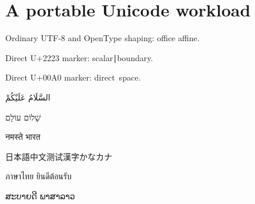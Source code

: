 \documentclass{article}
\providecommand{\aitexlanguage}[1]{}
\begin{document}
\section*{A portable Unicode workload}
Ordinary UTF-8 and OpenType shaping: office affine.

Direct U+2223 marker: scalar∣boundary.

Direct U+00A0 marker: direct space.




{\arabicfont\aitexlanguage{ar}السَّلَامُ عَلَيْكُمْ}

{\hebrewfont\aitexlanguage{he}שָׁלוֹם עוֹלָם}

{\devanagarifont\aitexlanguage{hi}नमस्ते भारत}

{\cjkfont\aitexlanguage{zh}日本語中文测试漢字かなカナ}

{\thaifont\aitexlanguage{th}ภาษาไทย ยินดีต้อนรับ}

{\laofont\aitexlanguage{lo}ສະບາຍດີ ພາສາລາວ}
\end{document}
